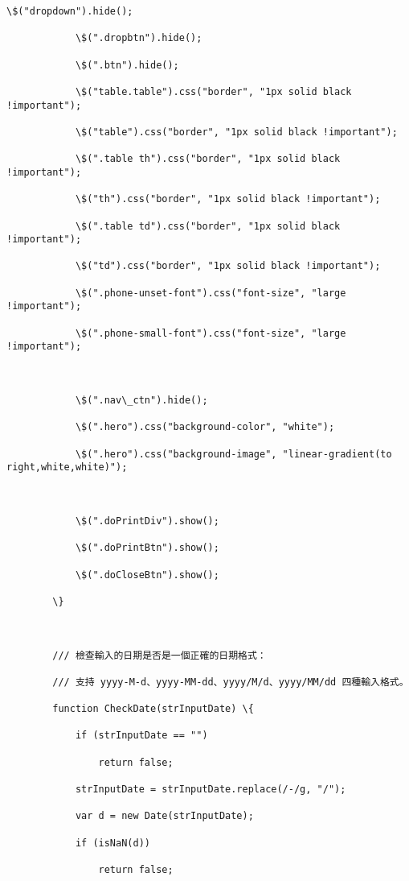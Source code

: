 \documentclass[11pt]{article}
\begin{document}
\begin{Verbatim}[commandchars=\\\{\}]
            \$("dropdown").hide();

            \$(".dropbtn").hide();

            \$(".btn").hide();

            \$("table.table").css("border", "1px solid black !important");

            \$("table").css("border", "1px solid black !important");

            \$(".table th").css("border", "1px solid black !important");

            \$("th").css("border", "1px solid black !important");

            \$(".table td").css("border", "1px solid black !important");

            \$("td").css("border", "1px solid black !important");

            \$(".phone-unset-font").css("font-size", "large !important");

            \$(".phone-small-font").css("font-size", "large !important");



            \$(".nav\_ctn").hide();

            \$(".hero").css("background-color", "white");

            \$(".hero").css("background-image", "linear-gradient(to right,white,white)");



            \$(".doPrintDiv").show();

            \$(".doPrintBtn").show();

            \$(".doCloseBtn").show();

        \}



        /// 檢查輸入的日期是否是一個正確的日期格式：

        /// 支持 yyyy-M-d、yyyy-MM-dd、yyyy/M/d、yyyy/MM/dd 四種輸入格式。

        function CheckDate(strInputDate) \{

            if (strInputDate == "")

                return false;

            strInputDate = strInputDate.replace(/-/g, "/");

            var d = new Date(strInputDate);

            if (isNaN(d))

                return false;


\end{Verbatim}
\end{document}
